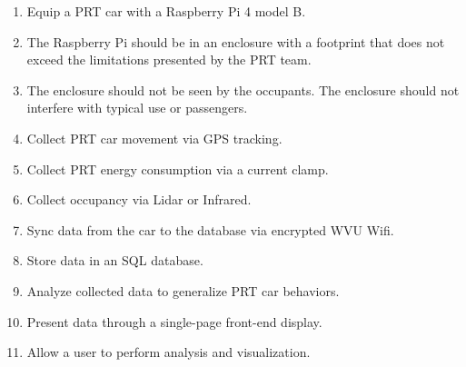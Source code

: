 \begin{enumerate}
    \item Equip a PRT car with a Raspberry Pi 4 model B. 
    \item The Raspberry Pi should be in an enclosure with a footprint that does not exceed the limitations presented by the PRT team.
    \item The enclosure should not be seen by the occupants. The enclosure should not interfere with typical use or passengers.
    \item Collect PRT car movement via GPS tracking.
    \item Collect PRT energy consumption via a current clamp.
    \item Collect occupancy via Lidar or Infrared. 
    \item Sync data from the car to the database via encrypted WVU Wifi. 
    \item Store data in an SQL database.
    \item Analyze collected data to generalize PRT car behaviors. 
    \item Present data through a single-page front-end display.
    \item Allow a user to perform analysis and visualization.
\end{enumerate}